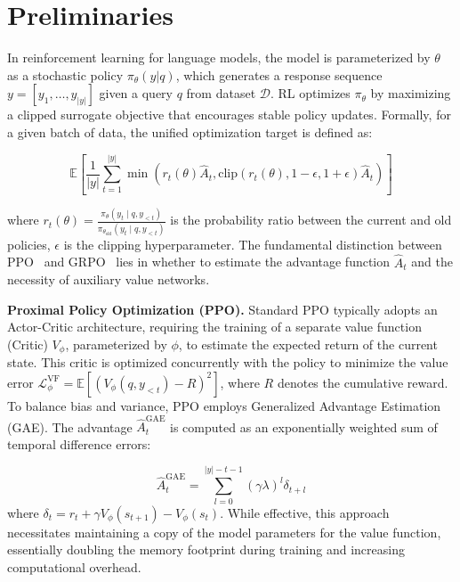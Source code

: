 

\section{Preliminaries}
In reinforcement learning  for language models, the model is parameterized by $\theta$ as a stochastic policy $\pi_\theta(y|q)$, which generates a response sequence $y = [y_1, \dots, y_{|y|}]$ given a query $q$ from dataset $\mathcal{D}$. RL optimizes $\pi_\theta$ by maximizing a clipped surrogate objective that encourages stable policy updates. Formally, for a given batch of data, the unified optimization target is defined as:

\begin{equation*}
\mathbb{E}\left[ \frac{1}{|y|} \sum_{t=1}^{|y|} \min \left( r_t(\theta) \hat{A}_t, \text{clip}(r_t(\theta), 1-\epsilon, 1+\epsilon) \hat{A}_t \right) \right]
\label{eq:unified_objective}
\end{equation*}

where $r_t(\theta) = \frac{\pi_\theta(y_t \mid q, y_{<t})}{\pi_{\theta_{\text{old}}}(y_t \mid q, y_{<t})}$ is the probability ratio between the current and old policies, $\epsilon$ is the clipping hyperparameter.
The fundamental distinction between PPO~\citep{schulman2017proximal} and GRPO~\citep{shao2024deepseekv3} lies in whether to estimate the advantage function $\hat{A}_t$ and the necessity of auxiliary value networks.

\textbf{Proximal Policy Optimization (PPO).} Standard PPO typically adopts an Actor-Critic architecture, requiring the training of a separate value function (Critic) $V_\phi$, parameterized by $\phi$, to estimate the expected return of the current state. This critic is optimized concurrently with the policy to minimize the value error $\mathcal{L}_\phi^{\text{VF}} = \mathbb{E} [ (V_\phi(q, y_{<t}) - R)^2 ]$, where $R$ denotes the cumulative reward. To balance bias and variance, PPO employs Generalized Advantage Estimation (GAE). The advantage $\hat{A}_t^{\text{GAE}}$ is computed as an exponentially weighted sum of temporal difference errors:

\begin{equation*}
\hat{A}_t^{\text{GAE}} = \sum_{l=0}^{|y|-t-1} (\gamma \lambda)^l \delta_{t+l}
\end{equation*}
where $\delta_t = r_t + \gamma V_\phi(s_{t+1}) - V_\phi(s_t)$.
While effective, this approach necessitates maintaining a copy of the model parameters for the value function, essentially doubling the memory footprint during training and increasing computational overhead.

